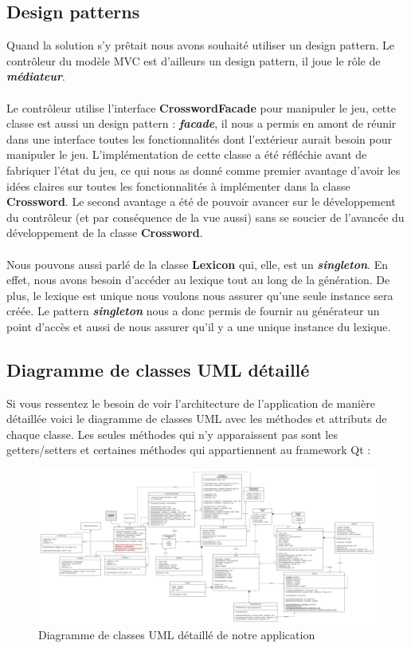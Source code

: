 \documentclass [ 11 pt ] {article}
\begin{document}
\subsection{Design patterns}
    Quand la solution s’y prêtait nous avons souhaité utiliser un design pattern.  Le contrôleur du modèle MVC est d’ailleurs un design pattern, il joue le rôle de \textbf{\textit{médiateur}}.
    \\\\
    Le contrôleur utilise l’interface \textbf{CrosswordFacade} pour manipuler le jeu, cette classe est aussi un design pattern : \textbf{\textit{facade}}, il nous a permis en amont de réunir dans une interface toutes les fonctionnalités dont l’extérieur aurait besoin pour manipuler le jeu. L’implémentation de cette classe a été réfléchie avant de fabriquer l’état du jeu, ce qui nous as donné comme premier avantage d’avoir les idées claires sur toutes les fonctionnalités à implémenter dans la classe \textbf{Crossword}. Le second avantage a été de pouvoir avancer sur le développement du contrôleur (et par conséquence de la vue aussi) sans se soucier de l’avancée du développement de la classe \textbf{Crossword}.
    \\\\
    Nous pouvons aussi parlé de la classe \textbf{Lexicon} qui, elle, est un \textbf{\textit{singleton}}. En effet, nous avons besoin d’accéder au lexique tout au long de la génération. De plus, le lexique est unique nous voulons nous assurer qu’une seule instance sera créée. Le pattern \textbf{\textit{singleton}} nous a donc permis de fournir au générateur un point d’accès et aussi de nous assurer qu’il y a une unique instance du lexique.

\subsection{Diagramme de classes UML détaillé}
    Si vous ressentez le besoin de voir l’architecture de l’application de manière détaillée voici le diagramme de classes UML avec les méthodes et attributs de chaque classe. Les seules méthodes qui n’y apparaissent pas sont les getters/setters et certaines méthodes qui appartiennent au framework Qt :
    \newpage
    \begin{landscape}
        \begin{figure}[H] 
        \center 
        \includegraphics[width=1\linewidth]{diag_classes_complet.jpeg}
        \caption{Diagramme de classes UML détaillé de notre application}
        \end{figure}
    \end{landscape}
    \newpage
    
\end{document}

